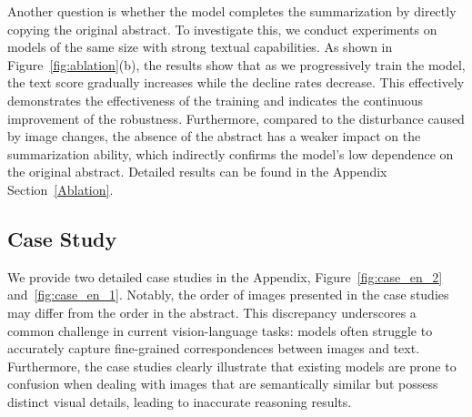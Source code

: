 Another question is whether the model completes the summarization by directly copying the original abstract. 
To investigate this, we conduct experiments on models of the same size with strong textual capabilities.
As shown in Figure~\ref{fig:ablation}(b), the results show that as we progressively train the model, the text score gradually increases while the decline rates decrease.
This effectively demonstrates the effectiveness of the training and indicates the continuous improvement of the robustness.
Furthermore, compared to the disturbance caused by image changes, the absence of the abstract has a weaker impact on the summarization ability, which indirectly confirms the model's low dependence on the original abstract.
Detailed results can be found in the Appendix Section~\ref{Ablation}.




\subsection{Case Study}
We provide two detailed case studies in the Appendix, Figure~\ref{fig:case_en_2} and~\ref{fig:case_en_1}.
Notably, the order of images presented in the case studies may differ from the order in the abstract. 
This discrepancy underscores a common challenge in current vision-language tasks: models often struggle to accurately capture fine-grained correspondences between images and text. 
Furthermore, the case studies clearly illustrate that existing models are prone to confusion when dealing with images that are semantically similar but possess distinct visual details, leading to inaccurate reasoning results. 